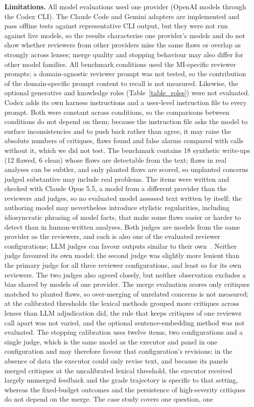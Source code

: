 \textbf{Limitations.} All model evaluations used one provider (OpenAI models through the Codex CLI). The Claude Code and Gemini adapters are implemented and pass offline tests against representative CLI output, but they were not run against live models, so the results characterise one provider's models and do not show whether reviewers from other providers miss the same flaws or overlap as strongly across lenses; merge quality and stopping behaviour may also differ for other model families. All benchmark conditions used the MI-specific reviewer prompts; a domain-agnostic reviewer prompt was not tested, so the contribution of the domain-specific prompt content to recall is not measured. Likewise, the optional generative and knowledge roles (Table~\ref{table_roles}) were not evaluated. Codex adds its own harness instructions and a user-level instruction file to every prompt. Both were constant across conditions, so the comparisons between conditions do not depend on them; because the instruction file asks the model to surface inconsistencies and to push back rather than agree, it may raise the absolute numbers of critiques, flaws found and false alarms compared with calls without it, which we did not test. The benchmark contains 18 synthetic write-ups (12 flawed, 6 clean) whose flaws are detectable from the text; flaws in real analyses can be subtler, and only planted flaws are scored, so unplanted concerns judged substantive may include real problems. The items were written and checked with Claude Opus 5.5, a model from a different provider than the reviewers and judges, so no evaluated model assessed text written by itself; the authoring model may nevertheless introduce stylistic regularities, including idiosyncratic phrasing of model facts, that make some flaws easier or harder to detect than in human-written analyses. Both judges are models from the same provider as the reviewers, and each is also one of the evaluated reviewer configurations; LLM judges can favour outputs similar to their own~\cite{zheng2023judging,wang2024fair}. Neither judge favoured its own model: the second judge was slightly more lenient than the primary judge for all three reviewer configurations, and least so for its own reviewers. The two judges also agreed closely, but neither observation excludes a bias shared by models of one provider. The merge evaluation scores only critiques matched to planted flaws, so over-merging of unrelated concerns is not measured; at the calibrated thresholds the lexical methods grouped more critiques across lenses than LLM adjudication did, the rule that keeps critiques of one reviewer call apart was not varied, and the optional sentence-embedding method was not evaluated. The stopping calibration uses twelve items, two configurations and a single judge, which is the same model as the executor and panel in one configuration and may therefore favour that configuration's revisions; in the absence of data the executor could only revise text, and because its panels merged critiques at the uncalibrated lexical threshold, the executor received largely unmerged feedback and the grade trajectory is specific to that setting, whereas the fixed-budget outcomes and the persistence of high-severity critiques do not depend on the merge. The case study covers one question, one 